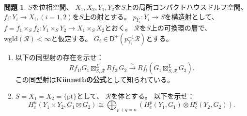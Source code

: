 \documentclass[uplatex,dvipdfmx]{jsarticle}
\theoremstyle{definition}
\newtheorem{prob}[prob]{問題}
\newcommand{\sfD}{\mathsf{D}}
\newcommand\mcR{\mathcal{R}}
\newcommand{\wgld}{\mathrm{wgld}}
\begin{document}
\begin{prob}\label{2.18}
  \(S\)を位相空間、
  \(X_1,X_2,Y_1,Y_2\)を\(S\)上の局所コンパクトハウスドルフ空間、
  \(f_i:Y_i\to X_i,(i=1,2)\)を\(S\)上の射とする。
  \(p_{Y_i}:Y_i\to S\)を構造射として、
  \(f=f_1\times_Sf_2:Y_1\times_S Y_2 \to X_1\times_S X_2\)とおく。
  \(\mcR\)を\(S\)上の可換環の層で、
  \(\wgld(\mcR) < \infty\)と仮定する。
  \(G_i\in \sfD^+(p_{Y_i}^{-1}\mcR)\)とする。
  \begin{enumerate}
    \item \label{2.18.1}
    以下の同型射の存在を示せ：
    \[
    Rf_{1!}G_1 \boxtimes_{S,\mcR}^L Rf_{2!}G_2
    \xrightarrow{\sim} Rf_!(G_1 \boxtimes_{S,\mcR}^L G_2).
    \]
    この同型射は\textbf{K\"{u}nnethの公式}として知られている。
    \item \label{2.18.2}
    \(S=X_1=X_2=\{\mathrm{pt}\}\)として、
    \(\mcR\)を体とする。
    以下を示せ：
    \[
    H^n_c(Y_1\times Y_2,G_1\boxtimes G_2) \cong
    \bigoplus_{p+q=n}(H^p_c(Y_1,G_1)\otimes H^q_c(Y_2,G_2)).
    \]
  \end{enumerate}
\end{prob}
\end{document}
